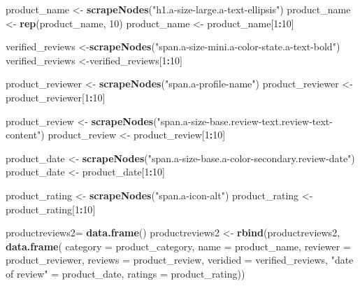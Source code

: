 \documentclass[
]{article}
\newenvironment{Shaded}{\begin{snugshade}}{\end{snugshade}}
\newcommand{\AttributeTok}[1]{\textcolor[rgb]{0.13,0.29,0.53}{#1}}
\newcommand{\DecValTok}[1]{\textcolor[rgb]{0.00,0.00,0.81}{#1}}
\newcommand{\FunctionTok}[1]{\textcolor[rgb]{0.13,0.29,0.53}{\textbf{#1}}}
\newcommand{\NormalTok}[1]{#1}
\newcommand{\OtherTok}[1]{\textcolor[rgb]{0.56,0.35,0.01}{#1}}
\newcommand{\SpecialCharTok}[1]{\textcolor[rgb]{0.81,0.36,0.00}{\textbf{#1}}}
\newcommand{\StringTok}[1]{\textcolor[rgb]{0.31,0.60,0.02}{#1}}
\begin{document}
\begin{Shaded}
\begin{Highlighting}[]
\NormalTok{  product\_name }\OtherTok{\textless{}{-}} \FunctionTok{scrapeNodes}\NormalTok{(}\StringTok{"h1.a{-}size{-}large.a{-}text{-}ellipsis"}\NormalTok{)}
\NormalTok{  product\_name }\OtherTok{\textless{}{-}} \FunctionTok{rep}\NormalTok{(product\_name, }\DecValTok{10}\NormalTok{)}
\NormalTok{  product\_name }\OtherTok{\textless{}{-}}\NormalTok{ product\_name[}\DecValTok{1}\SpecialCharTok{:}\DecValTok{10}\NormalTok{]}
  
\NormalTok{  verified\_reviews }\OtherTok{\textless{}{-}}\FunctionTok{scrapeNodes}\NormalTok{(}\StringTok{"span.a{-}size{-}mini.a{-}color{-}state.a{-}text{-}bold"}\NormalTok{)}
\NormalTok{  verified\_reviews }\OtherTok{\textless{}{-}}\NormalTok{verified\_reviews[}\DecValTok{1}\SpecialCharTok{:}\DecValTok{10}\NormalTok{]}
  
\NormalTok{  product\_reviewer }\OtherTok{\textless{}{-}} \FunctionTok{scrapeNodes}\NormalTok{(}\StringTok{"span.a{-}profile{-}name"}\NormalTok{)}
\NormalTok{  product\_reviewer }\OtherTok{\textless{}{-}}\NormalTok{ product\_reviewer[}\DecValTok{1}\SpecialCharTok{:}\DecValTok{10}\NormalTok{]}
  
\NormalTok{  product\_review }\OtherTok{\textless{}{-}} \FunctionTok{scrapeNodes}\NormalTok{(}\StringTok{"span.a{-}size{-}base.review{-}text.review{-}text{-}content"}\NormalTok{)}
\NormalTok{  product\_review }\OtherTok{\textless{}{-}}\NormalTok{ product\_review[}\DecValTok{1}\SpecialCharTok{:}\DecValTok{10}\NormalTok{]}
  
\NormalTok{  product\_date }\OtherTok{\textless{}{-}} \FunctionTok{scrapeNodes}\NormalTok{(}\StringTok{"span.a{-}size{-}base.a{-}color{-}secondary.review{-}date"}\NormalTok{)}
\NormalTok{  product\_date }\OtherTok{\textless{}{-}}\NormalTok{ product\_date[}\DecValTok{1}\SpecialCharTok{:}\DecValTok{10}\NormalTok{]}
  
\NormalTok{  product\_rating }\OtherTok{\textless{}{-}} \FunctionTok{scrapeNodes}\NormalTok{(}\StringTok{"span.a{-}icon{-}alt"}\NormalTok{)}
\NormalTok{  product\_rating }\OtherTok{\textless{}{-}}\NormalTok{ product\_rating[}\DecValTok{1}\SpecialCharTok{:}\DecValTok{10}\NormalTok{]}
  
\NormalTok{  productreviews2}\OtherTok{=} \FunctionTok{data.frame}\NormalTok{()}
\NormalTok{  productreviews2 }\OtherTok{\textless{}{-}} \FunctionTok{rbind}\NormalTok{(productreviews2, }\FunctionTok{data.frame}\NormalTok{(}
                      \AttributeTok{category =}\NormalTok{ product\_category,}
                      \AttributeTok{name =}\NormalTok{ product\_name,}
                      \AttributeTok{reviewer =}\NormalTok{ product\_reviewer,}
                      \AttributeTok{reviews =}\NormalTok{ product\_review,}
                      \AttributeTok{veridied =}\NormalTok{ verified\_reviews,}
                      \StringTok{"date of review"} \OtherTok{=}\NormalTok{ product\_date,}
                      \AttributeTok{ratings =}\NormalTok{ product\_rating))}
  

\end{Highlighting}
\end{Shaded}
\end{document}
